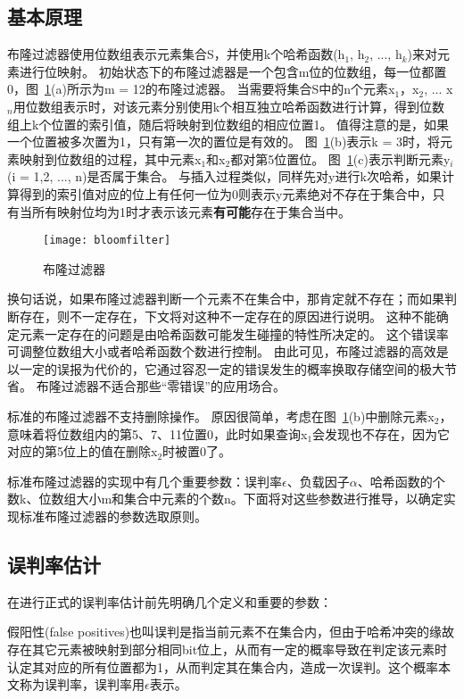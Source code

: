 \subsection{基本原理}
布隆过滤器使用位数组表示元素集合S，并使用k个哈希函数(h$_1$, h$_2$, ..., h$_k$)来对元素进行位映射。
初始状态下的布隆过滤器是一个包含m位的位数组，每一位都置0，图~\ref{fig:bf}(a)所示为m = 12的布隆过滤器。
当需要将集合S中的n个元素x$_1$，x$_2$, ... x$_n$用位数组表示时，对该元素分别使用k个相互独立哈希函数进行计算，得到位数组上k个位置的索引值，随后将映射到位数组的相应位置1。
值得注意的是，如果一个位置被多次置为1，只有第一次的置位是有效的。
图~\ref{fig:bf}(b)表示k = 3时，将元素映射到位数组的过程，其中元素x$_1$和x$_2$都对第5位置位。
图~\ref{fig:bf}(c)表示判断元素y$_i$(i = 1,2, ..., n)是否属于集合。
与插入过程类似，同样先对y进行k次哈希，如果计算得到的索引值对应的位上有任何一位为0则表示y元素绝对不存在于集合中，只有当所有映射位均为1时才表示该元素\textbf{有可能}存在于集合当中。
\begin{figure}[htbp]
\centering
\texttt{[image: bloomfilter]}
\caption{布隆过滤器}\label{fig:bf}
\end{figure}
换句话说，如果布隆过滤器判断一个元素不在集合中，那肯定就不存在；而如果判断存在，则不一定存在，下文将对这种不一定存在的原因进行说明。
这种不能确定元素一定存在的问题是由哈希函数可能发生碰撞的特性所决定的。
这个错误率可调整位数组大小或者哈希函数个数进行控制。
由此可见，布隆过滤器的高效是以一定的误报为代价的，它通过容忍一定的错误发生的概率换取存储空间的极大节省。
布隆过滤器不适合那些“零错误”的应用场合。

标准的布隆过滤器不支持删除操作。
原因很简单，考虑在图~\ref{fig:bf}(b)中删除元素x$_2$，意味着将位数组内的第5、7、11位置0，此时如果查询x$_1$会发现也不存在，因为它对应的第5位上的值在删除x$_2$时被置0了。

标准布隆过滤器的实现中有几个重要参数：误判率\begin{math}\epsilon\end{math}、负载因子\begin{math}\alpha\end{math}、哈希函数的个数k、位数组大小m和集合中元素的个数n。下面将对这些参数进行推导，以确定实现标准布隆过滤器的参数选取原则。

\subsection{误判率估计}
在进行正式的误判率估计前先明确几个定义和重要的参数：
\begin{definition}
	假阳性(false positives)也叫误判是指当前元素不在集合内，但由于哈希冲突的缘故存在其它元素被映射到部分相同bit位上，从而有一定的概率导致在判定该元素时认定其对应的所有位置都为1，从而判定其在集合内，造成一次误判。这个概率本文称为误判率，误判率用\begin{math}\epsilon\end{math}表示。
\end{definition}

